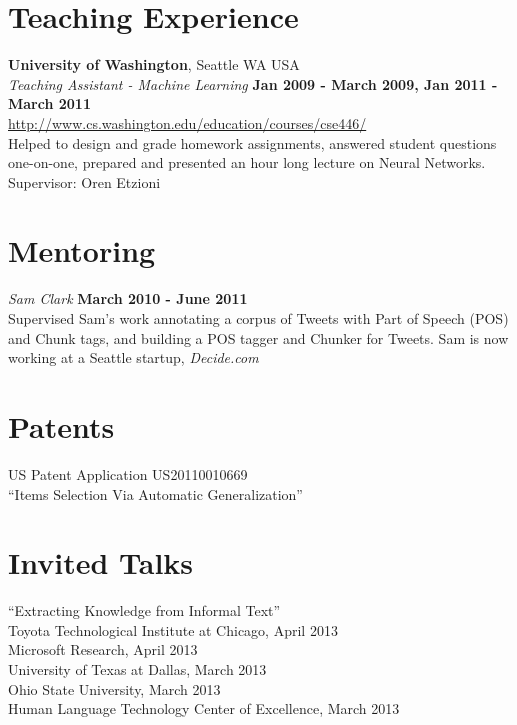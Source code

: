 \documentclass[margin,line]{res}
\begin{document}
\begin{resume}
\section{\sc Teaching Experience}

{\bf University of Washington}, Seattle WA USA\\
{\em Teaching Assistant - Machine Learning} \hfill {\bf Jan 2009 - March 2009, Jan 2011 - March 2011} \\
\url{http://www.cs.washington.edu/education/courses/cse446/} \\
Helped to design and grade homework assignments, answered student questions one-on-one, prepared and presented an hour long
lecture on Neural Networks. \\
Supervisor: Oren Etzioni

\section{\sc Mentoring}

{\em Sam Clark} \hfill {\bf March 2010 - June 2011} \\
Supervised Sam's work annotating a corpus of Tweets with Part of Speech (POS) and Chunk tags, and building a POS tagger and Chunker
for Tweets.  Sam is now working at a Seattle startup, {\em Decide.com}

\section{\sc Patents}
US Patent Application US20110010669 \\
``Items Selection Via Automatic Generalization''

\section{\sc Invited Talks}
``Extracting Knowledge from Informal Text'' \\
Toyota Technological Institute at Chicago, April 2013 \\
Microsoft Research, April 2013 \\
University of Texas at Dallas, March 2013 \\
Ohio State University, March 2013 \\
Human Language Technology Center of Excellence, March 2013 \\


\end{resume}
\end{document}
